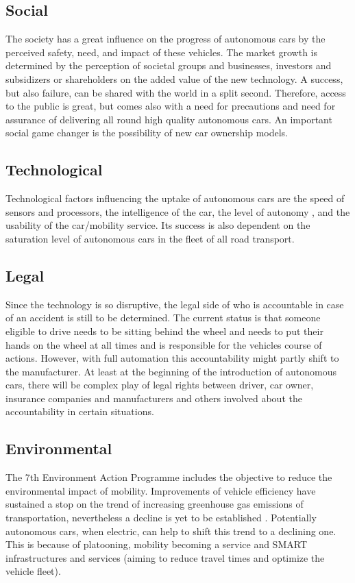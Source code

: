 \documentclass[a4paper]{article}
\begin{document}
\subsection{Social}
\label{sec:social}
The society has a great influence on the progress of autonomous cars by the perceived safety, need, and impact of these vehicles. The market growth is determined by the perception of societal groups and businesses, investors and subsidizers or shareholders on the added value of the new technology. A success, but also failure, can be shared with the world in a split second. Therefore, access to the public is great, but comes also with a need for precautions and need for assurance of delivering all round high quality autonomous cars. 
An important social game changer is the possibility of new car ownership models.

\subsection{Technological}
\label{sec:technological}
Technological factors influencing the uptake of autonomous cars are the speed of sensors and processors, the intelligence of the car, the level of autonomy \cite{KAUR201887}, and the usability of the car/mobility service. Its success is also dependent on the saturation level of autonomous cars in the fleet of all road transport.

\subsection{Legal}
\label{sec:not-gal}
Since the technology is so disruptive, the legal side of who is accountable in case of an accident is still to be determined. The current status is that someone eligible to drive needs to be sitting behind the wheel and needs to put their hands on the wheel at all times and is responsible for the vehicles course of actions. However, with full automation this accountability might partly shift to the manufacturer. At least at the beginning of the introduction of autonomous cars, there will be complex play of legal rights between driver, car owner, insurance companies and manufacturers and others involved about the accountability in certain situations.

\subsection{Environmental}
\label{sec:environmental}

The 7th Environment Action Programme includes the objective to reduce the environmental impact of mobility. Improvements of vehicle efficiency have sustained a stop on the trend of increasing greenhouse gas emissions of transportation, nevertheless a decline is yet to be established \cite{EEA}. Potentially autonomous cars, when electric, can help to shift this trend to a declining one. This is because of platooning, mobility becoming a service and SMART infrastructures and services (aiming to reduce travel times and optimize the vehicle fleet).
\end{document}
